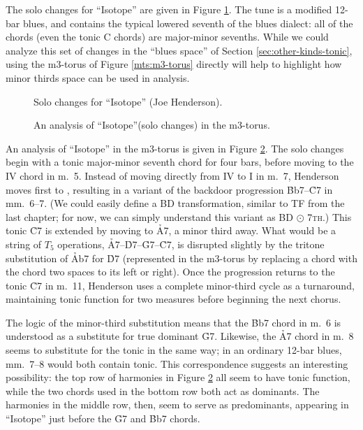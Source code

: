 The solo changes for ``Isotope'' are given in Figure
\ref{mts:isotope-solo-changes}. The tune is a modified 12-bar blues,
and contains the typical lowered seventh of the blues dialect: all of the
chords (even the tonic C chords) are major-minor sevenths. While we could
analyze this set of changes in the ``blues \tf space'' of Section
\ref{sec:other-kinds-tonic}, using the m3-torus of Figure \ref{mts:m3-torus}
directly will help to highlight how minor thirds space can be used in analysis.

\begin{figure}[bp]
  \caption{Solo changes for ``Isotope'' (Joe Henderson).}
  \label{mts:isotope-solo-changes}
\end{figure}

\begin{figure}[tbp]
  \caption{An analysis of ``Isotope''(solo changes) in the m3-torus.}
  \label{mts:isotope-torus}
\end{figure}

An analysis of ``Isotope'' in the m3-torus is given in Figure
\ref{mts:isotope-torus}. The solo changes begin with a tonic major-minor
seventh chord for four bars, before moving to the IV chord in m.~5. Instead of
moving directly from IV to I in m.~7, Henderson moves first to \Bflat,
resulting in a variant of the backdoor progression \h{Bb7}--\h{C7} in
mm.~6--7. (We could easily define a BD transformation, similar to
TF from the last chapter; for now, we can simply understand this
variant as BD $\odot$ \textsc{7th}.) This tonic \h{C7} is extended by moving
to \h{A7}, a minor third away. What would be a string of $T_5$ operations,
\h{A7}--\h{D7}--\h{G7}--\h{C7}, is disrupted slightly by the tritone
substitution of \h{Ab7} for \h{D7} (represented in the m3-torus by
replacing a chord with the chord two spaces to its left or right). Once the
progression returns to the tonic \h{C7} in m.~11, Henderson uses a complete
minor-third cycle as a turnaround, maintaining tonic function for two measures
before beginning the next chorus.


The logic of the minor-third substitution means that the \h{Bb7} chord in m.~6
is understood as a substitute for true dominant \h{G7}. Likewise, the \h{A7}
chord in m.~8 seems to substitute for the tonic in the same way; in an
ordinary 12-bar blues, mm.~7--8 would both contain tonic. This correspondence
suggests an interesting possibility: the top row of harmonies in Figure
\ref{mts:isotope-torus} all seem to have tonic function, while the two chords
used in the bottom row both act as dominants. The harmonies in the middle row,
then, seem to serve as predominants, appearing in ``Isotope'' just before the
\h{G7} and \h{Bb7} chords.

